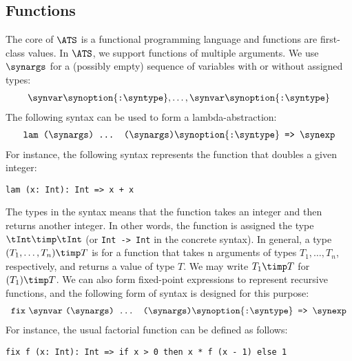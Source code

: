 \subsection{Functions}
The core of $\ATS$ is a functional programming language and functions are
first-class values.  In $\ATS$, we support functions of multiple arguments.
We use $\synargs$ for a (possibly empty) sequence of variables with or
without assigned types:
\[\begin{array}{c}
\synvar\synoption{\texttt{:}\syntype},\ldots,\synvar\synoption{\texttt{:}\syntype}
\end{array}\]
The following syntax can be used to form a lambda-abstraction:
\[\begin{array}{c}
\texttt{lam (}\synargs\texttt{) ... (}\synargs\texttt{)}\synoption{\texttt{:}\syntype}\texttt{ => }\synexp
\end{array}\]
For instance, the following syntax represents the function that doubles a
given integer:
\begin{verbatim}
lam (x: Int): Int => x + x
\end{verbatim}
The types in the syntax means that the function takes an integer and then
returns another integer. In other words, the function is assigned the type
$\tInt\timp\tInt$ (or \texttt{Int -> Int} in the concrete syntax). In
general, a type $(T_1,\ldots,T_n)\timp T$ is for a function that takes n
arguments of types $T_1,\ldots,T_n$, respectively, and returns a value of
type $T$. We may write $T_1\timp T$ for $(T_1)\timp T$.  We can also form
fixed-point expressions to represent recursive functions, and the following
form of syntax is designed for this purpose:
\[\begin{array}{c}
\texttt{fix}~\synvar~\texttt{(}\synargs\texttt{) ... (}\synargs\texttt{)}\synoption{\texttt{:}\syntype}\texttt{ => }\synexp
\end{array}\]
For instance, the usual factorial function can be defined as follows:
\begin{verbatim}
fix f (x: Int): Int => if x > 0 then x * f (x - 1) else 1
\end{verbatim}

